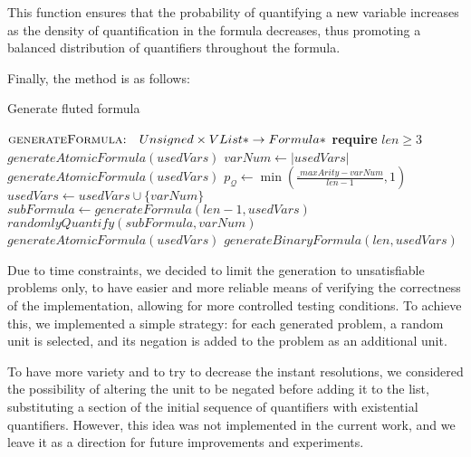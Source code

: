 This function ensures that the probability of quantifying a new variable increases as the density of quantification in the formula decreases, thus promoting a balanced distribution of quantifiers throughout the formula.

Finally, the  method is as follows:
\begin{algorithm}[H]
  \caption{Generate fluted formula}\label{alg:generate-fluted-formula}
  \begin{algorithmic}[1]
      \Statex{}  \(\textsc{generateFormula:} \quad Unsigned \times VList* \to Formula*\)
      \Statex{} \textbf{require} \(len \geq 3\)
          \State{} \Return{} \(generateAtomicFormula(usedVars)\)
        \EndIf{}
        \State{} \(varNum \gets |usedVars|\)
            \State{} \Return{} \(generateAtomicFormula(usedVars)\)
          \EndIf{}
        \Else{}
          \State{} \(p_{\mathcal{Q}} \gets \min\left(\frac{\_maxArity - varNum}{len - 1}, 1\right)\)
            \State{} \(usedVars \gets usedVars \cup \{varNum\}\)
            \State{} \(subFormula \gets generateFormula(len - 1, usedVars)\)
            \State{} \Return{} \(randomlyQuantify(subFormula, varNum)\)
          \EndIf{}
        \EndIf{}
          \State{} \Return{} \(generateAtomicFormula(usedVars)\)
        \Else{}
          \State{} \Return{} \(generateBinaryFormula(len, usedVars)\)
        \EndIf{}
      \EndFunction{}
  \end{algorithmic}
\end{algorithm}

Due to time constraints, we decided to limit the generation to unsatisfiable problems only, to have easier and more reliable means of verifying the correctness of the implementation, allowing for more controlled testing conditions.
To achieve this, we implemented a simple strategy: for each generated problem, a random unit is selected, and its negation is added to the problem as an additional unit.

To have more variety and to try to decrease the instant resolutions, we considered the possibility of altering the unit to be negated before adding it to the list, substituting a section of the initial sequence of quantifiers with existential quantifiers.
However, this idea was not implemented in the current work, and we leave it as a direction for future improvements and experiments.
